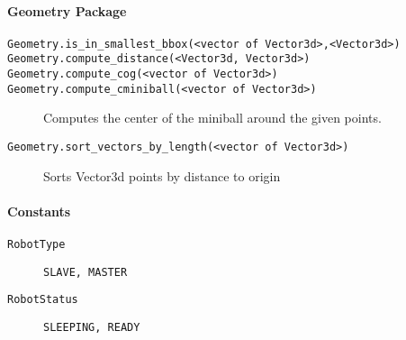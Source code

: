 \paragraph{Geometry Package}
\begin{description}
	\item [\texttt{Geometry.is\_in\_smallest\_bbox(<vector of Vector3d>,<Vector3d>)}]
	\item [\texttt{Geometry.compute\_distance(<Vector3d, Vector3d>)}]
	\item [\texttt{Geometry.compute\_cog(<vector of Vector3d>)}]
	\item [\texttt{Geometry.compute\_cminiball(<vector of Vector3d>)}] Computes the center of the miniball around the given points.
	\item [\texttt{Geometry.sort\_vectors\_by\_length(<vector of Vector3d>)}] Sorts Vector3d points by distance to origin
\end{description}


\paragraph{\Lua Constants}
\begin{description}
	\item [\texttt{RobotType}] \texttt{SLAVE, MASTER}
	\item [\texttt{RobotStatus}] \texttt{SLEEPING, READY}
\end{description}

